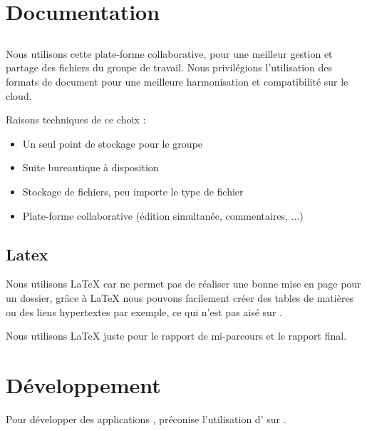 \section{Documentation}
\subsection{\googleDrive}
Nous utilisons cette plate-forme collaborative, pour une meilleur gestion et partage des fichiers du groupe de travail. Nous privilégions l'utilisation des formats de document \google{} pour une meilleure harmonisation et compatibilité sur le cloud.

Raisons techniques de ce choix :
\begin{itemize}
\item Un seul point de stockage pour le groupe
\item Suite bureautique à disposition
\item Stockage de fichiers, peu importe le type de fichier
\item Plate-forme collaborative (édition simultanée, commentaires, ...)
\end{itemize}

\subsection{Latex}
Nous utilisons \LaTeX{} car \googleDocuments{} ne permet pas de réaliser une bonne mise en page pour un dossier, gr\^{a}ce à \LaTeX{} nous pouvons facilement créer des tables de matières ou des liens hypertextes par exemple, ce qui n'est pas aisé sur \googleDocuments{}.

Nous utilisons \LaTeX{} juste pour le rapport de mi-parcours et le rapport final.

\section{Développement}
Pour développer des applications \android{}, \google{} préconise l'utilisation d'\eclipse{} sur \ubuntu{}.

